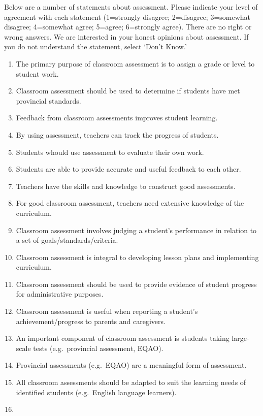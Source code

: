 \documentclass[
]{book}
\providecommand{\tightlist}{%
  \setlength{\itemsep}{0pt}\setlength{\parskip}{0pt}}
\begin{document}
Below are a number of statements about assessment. Please indicate your level of agreement with each statement (1=strongly disagree; 2=disagree; 3=somewhat disagree; 4=somewhat agree; 5=agree; 6=strongly agree). There are no right or wrong answers. We are interested in your honest opinions about assessment. If you do not understand the statement, select `Don't Know.'

\begin{enumerate}
\def\labelenumi{\arabic{enumi}.}
\tightlist
\item
  The primary purpose of classroom assessment is to assign a grade or level to student work.
\item
  Classroom assessment should be used to determine if students have met provincial standards.
\item
  Feedback from classroom assessments improves student learning.
\item
  By using assessment, teachers can track the progress of students.
\item
  Students whould use assessment to evaluate their own work.
\item
  Students are able to provide accurate and useful feedback to each other.
\item
  Teachers have the skills and knowledge to construct good assessments.
\item
  For good classroom assessment, teachers need extensive knowledge of the curriculum.
\item
  Classroom assessment involves judging a student's performance in relation to a set of goals/standards/criteria.
\item
  Classroom assessment is integral to developing lesson plans and implementing curriculum.
\item
  Classroom assessment should be used to provide evidence of student progress for administrative purposes.
\item
  Classroom assessment is useful when reporting a student's achievement/progress to parents and caregivers.
\item
  An important component of classroom assessment is students taking large-scale tests (e.g.~provincial assessment, EQAO).
\item
  Provincial assessments (e.g.~EQAO) are a meaningful form of assessment.
\item
  All classroom assessments should be adapted to suit the learning needs of identified students (e.g.~English language learners).
\item

\end{enumerate}
\end{document}
